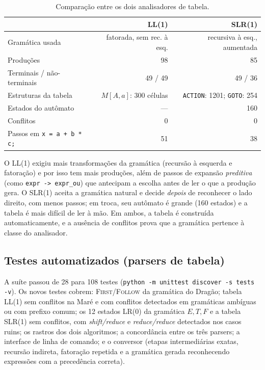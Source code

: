 \documentclass[conference]{IEEEtran}
\begin{document}
\begin{table}[t]
\centering
\caption{Comparação entre os dois analisadores de tabela.}\label{tab:comparacao}
\small
\begin{tabular}{@{}lrr@{}}
\toprule
 & LL(1) & SLR(1) \\
\midrule
Gramática usada & fatorada, sem rec. à esq. & recursiva à esq., aumentada \\
Produções & 98 & 85 \\
Terminais / não-terminais & 49 / 49 & 49 / 36 \\
Estruturas da tabela & $M[A,a]$: 300 células & \texttt{ACTION}: 1201; \texttt{GOTO}: 254 \\
Estados do autômato & --- & 160 \\
Conflitos & 0 & 0 \\
Passos em \texttt{x = a + b * c;} & 51 & 38 \\
\bottomrule
\end{tabular}
\end{table}

O LL(1) exigiu mais transformações da gramática (recursão à esquerda e
fatoração) e por isso tem mais produções, além de passos de expansão
\emph{preditiva} (como \texttt{expr -> expr\_ou}) que antecipam a escolha antes
de ler o que a produção gera. O SLR(1) aceita a gramática natural e decide
\emph{depois} de reconhecer o lado direito, com menos passos; em troca, seu
autômato é grande (160 estados) e a tabela é mais difícil de ler à mão. Em ambos,
a tabela é construída automaticamente, e a ausência de conflitos prova que a
gramática pertence à classe do analisador.

\subsection{Testes automatizados (parsers de tabela)}
A suíte passou de 28 para 108 testes (\texttt{python -m unittest discover -s tests -v}).
Os novos testes cobrem: \textsc{First}/\textsc{Follow} da gramática do Dragão;
tabela LL(1) sem conflitos na Maré e com conflitos detectados em gramáticas
ambíguas ou com prefixo comum; os 12 estados LR(0) da gramática $E,T,F$ e a
tabela SLR(1) sem conflitos, com \emph{shift/reduce} e \emph{reduce/reduce}
detectados nos casos ruins; os rastros dos dois algoritmos; a concordância
entre os três parsers; a interface de linha de comando; e o conversor
(etapas intermediárias exatas, recursão indireta, fatoração repetida e a
gramática gerada reconhecendo expressões com a precedência correta).
\end{document}
